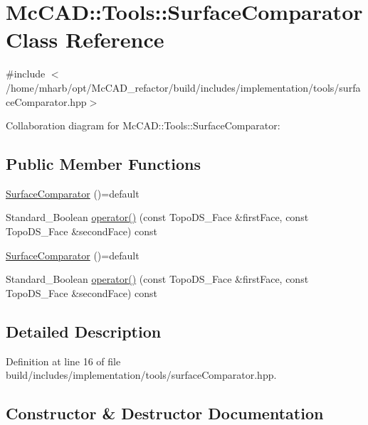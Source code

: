 \hypertarget{classMcCAD_1_1Tools_1_1SurfaceComparator}{}\section{Mc\+C\+AD\+:\+:Tools\+:\+:Surface\+Comparator Class Reference}
\label{classMcCAD_1_1Tools_1_1SurfaceComparator}


{\ttfamily \#include $<$/home/mharb/opt/\+Mc\+C\+A\+D\+\_\+refactor/build/includes/implementation/tools/surface\+Comparator.\+hpp$>$}



Collaboration diagram for Mc\+C\+AD\+:\+:Tools\+:\+:Surface\+Comparator\+:
\subsection*{Public Member Functions}
\begin{DoxyCompactItemize}
\item 
\hyperlink{classMcCAD_1_1Tools_1_1SurfaceComparator_a43905b4c49b4a27e5fc809b37a96c308}{Surface\+Comparator} ()=default
\item 
Standard\+\_\+\+Boolean \hyperlink{classMcCAD_1_1Tools_1_1SurfaceComparator_a4c95d31c14ea0c9f442d378ab65d9b1f}{operator()} (const Topo\+D\+S\+\_\+\+Face \&first\+Face, const Topo\+D\+S\+\_\+\+Face \&second\+Face) const
\item 
\hyperlink{classMcCAD_1_1Tools_1_1SurfaceComparator_a43905b4c49b4a27e5fc809b37a96c308}{Surface\+Comparator} ()=default
\item 
Standard\+\_\+\+Boolean \hyperlink{classMcCAD_1_1Tools_1_1SurfaceComparator_a4c95d31c14ea0c9f442d378ab65d9b1f}{operator()} (const Topo\+D\+S\+\_\+\+Face \&first\+Face, const Topo\+D\+S\+\_\+\+Face \&second\+Face) const
\end{DoxyCompactItemize}


\subsection{Detailed Description}


Definition at line 16 of file build/includes/implementation/tools/surface\+Comparator.\+hpp.



\subsection{Constructor \& Destructor Documentation}
\mbox{\label{classMcCAD_1_1Tools_1_1SurfaceComparator_a43905b4c49b4a27e5fc809b37a96c308}} 
